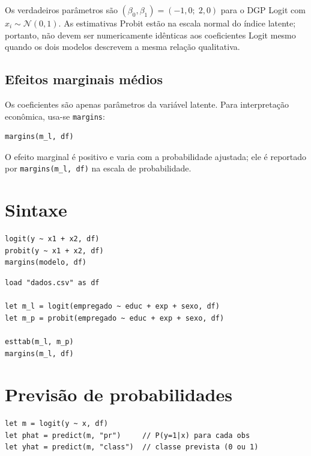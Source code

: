 Os verdadeiros parâmetros são $(\beta_0, \beta_1) = (-1{,}0;\; 2{,}0)$ para
o DGP Logit com $x_i \sim \mathcal{N}(0,1)$. As estimativas Probit estão na
escala normal do índice latente; portanto, não devem ser numericamente idênticas
aos coeficientes Logit mesmo quando os dois modelos descrevem a mesma relação
qualitativa.

\subsection*{Efeitos marginais médios}

Os coeficientes são apenas parâmetros da variável latente. Para
interpretação econômica, usa-se \lstinline{margins}:

\begin{lstlisting}[caption={AME do Logit}]
margins(m_l, df)
\end{lstlisting}

O efeito marginal é positivo e varia com a probabilidade ajustada; ele é
reportado por \lstinline{margins(m_l, df)} na escala de probabilidade.

\section{Sintaxe}

\begin{lstlisting}
logit(y ~ x1 + x2, df)
probit(y ~ x1 + x2, df)
margins(modelo, df)
\end{lstlisting}

\begin{lstlisting}[caption={Fluxo típico — escolha discreta}]
load "dados.csv" as df

let m_l = logit(empregado ~ educ + exp + sexo, df)
let m_p = probit(empregado ~ educ + exp + sexo, df)

esttab(m_l, m_p)
margins(m_l, df)
\end{lstlisting}

\section{Previsão de probabilidades}

\begin{lstlisting}
let m = logit(y ~ x, df)
let phat = predict(m, "pr")     // P(y=1|x) para cada obs
let yhat = predict(m, "class")  // classe prevista (0 ou 1)
\end{lstlisting}


